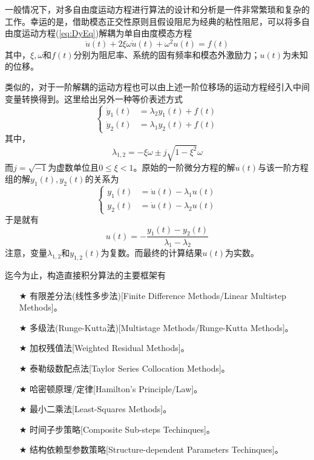 一般情况下，对多自由度运动方程进行算法的设计和分析是一件非常繁琐和复杂的工作。幸运的是，借助模态正交性原则\cite{book:dover}且假设阻尼为经典的粘性阻尼，可以将多自由度运动方程(\ref{eq:DyEq})解耦为单自由度模态方程
\begin{equation}
\ddot{u}(t)+2\xi\omega\dot{u}(t)+\omega^2u(t)=f(t)
\end{equation}
其中，$\xi,\omega$和$f(t)$分别为阻尼率、系统的固有频率和模态外激励力；$u(t)$为未知的位移。

类似的，对于一阶解耦的运动方程也可以由上述一阶位移场的运动方程经引入中间变量转换得到。这里给出另外一种等价表述方式\cite{Fung1996e,Fung1996a}
\begin{equation}
\left\{
\begin{aligned}
\dot{y}_1(t)&=\lambda_2y_1(t)+f(t)\\
\dot{y}_2(t)&=\lambda_1y_2(t)+f(t)
\end{aligned}\right.
\end{equation}
其中，
\begin{equation}
\lambda_{1,2}=-\xi\omega\pm j\sqrt{1-\xi^2}\omega
\end{equation}
而$j=\sqrt{-1}$为虚数单位且$0\le\xi<1$。原始的一阶微分方程的解$u(t)$与该一阶方程组的解$y_1(t),y_2(t)$的关系为
\begin{equation}
\left\{
\begin{aligned}
y_1(t)&=\dot{u}(t)-\lambda_1u(t)\\
y_2(t)&=\dot{u}(t)-\lambda_2u(t)
\end{aligned}
\right.
\end{equation}
于是就有
\begin{equation}
u(t)=-\frac{y_1(t)-y_2(t)}{\lambda_1-\lambda_2}
\end{equation}
注意，变量$\lambda_{1,2}$和$y_{1,2}(t)$为复数。而最终的计算结果$u(t)$为实数。

迄今为止，构造直接积分算法的主要框架有
\begin{itemize}
\item[$\bigstar$] 有限差分法(线性多步法)[Finite Difference Methods/Linear Multistep Methods]。
\item[$\bigstar$] 多级法(Runge-Kutta法)[Multistage Methods/Runge-Kutta Methods]。
\item[$\bigstar$] 加权残值法[Weighted Residual Methods]。
\item[$\bigstar$] 泰勒级数配点法[Taylor Series Collocation Methods]。
\item[$\bigstar$] 哈密顿原理/定律[Hamilton's Principle/Law]。
\item[$\bigstar$] 最小二乘法[Least-Squares Methods]。
\item[$\bigstar$] 时间子步策略[Composite Sub-steps Techinques]。
\item[$\bigstar$] 结构依赖型参数策略[Structure-dependent Parameters Techinques]。
\end{itemize}

